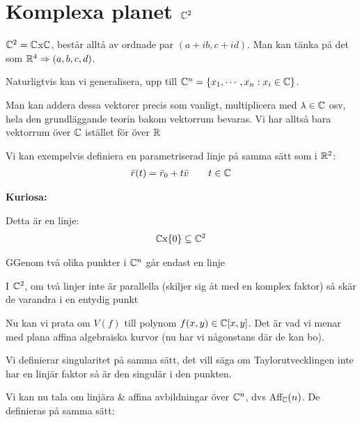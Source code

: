 \section{Komplexa planet $\mathbb{C}^2$}
\par\bigskip
\noindent $\mathbb{C}^2 = \mathbb{C}$x$\mathbb{C}$, består alltå av ordnade par $(a+ib, c+id)$. Man kan tänka på det som $\mathbb{R}^4\Rightarrow (a,b,c,d)$.\par
\noindent Naturligtvis kan vi generalisera, upp till $\mathbb{C}^n  = \{x_1,\cdots,x_n : x_i\in\mathbb{C}\}$.\par
\noindent Man kan addera dessa vektorer precis som vanligt, multiplicera med $\lambda\in\mathbb{C}$ osv, hela den grundläggande teorin bakom vektorrum bevaras. Vi har alltså bara vektorrum över $\mathbb{C}$ istället för över $\mathbb{R}$
\par\bigskip
\noindent Vi kan exempelvis definiera en parametriserad linje på samma sätt som i $\mathbb{R}^2$:
\begin{equation*}
  \begin{gathered}
    \bar{r}(t) = \bar{r}_0+t\bar{v}\qquad t\in\mathbb{C}
  \end{gathered}
\end{equation*}
\par\bigskip
\noindent\textbf{Kuriosa:}\par
\noindent Detta är en linje:
\begin{equation*}
  \begin{gathered}
    \mathbb{C}\text{x}\{0\}\subseteq\mathbb{C}^2
  \end{gathered}
\end{equation*}
\par\bigskip
\begin{theo}
  GGenom två olika punkter i $\mathbb{C}^n$ går endast en linje
\end{theo}
\par\bigskip
\begin{theo}
  I $\mathbb{C}^2$, om två linjer inte är parallella (skiljer sig åt med en komplex faktor) så skär de varandra i en entydig punkt
\end{theo}
\par\bigskip
\noindent Nu kan vi prata om $V(f)$ till polynom $f(x,y)\in\mathbb{C}[x,y]$. Det är vad vi menar med plana affina algebraiska kurvor (nu har vi någonstans där de kan bo).
\par\bigskip
\noindent Vi definierar singularitet på samma sätt, det vill säga om Taylorutvecklingen inte har en linjär faktor så är den singulär i den punkten.
\par\bigskip
\noindent Vi kan nu tala om linjära \& affina avbildningar över $\mathbb{C}^n$, dvs Aff$_{\mathbb{C}}(n)$. De definieras på samma sätt:
